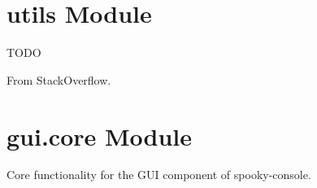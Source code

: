 \documentclass[letterpaper,10pt,english,openany,oneside]{sphinxmanual}
\begin{document}
\section{utils Module}
\label{\detokenize{api:module-spookyconsole.utils}}\label{\detokenize{api:utils-module}}
TODO

\begin{fulllineitems}
\label{\detokenize{api:spookyconsole.utils.find_nth}}
From StackOverflow.

\end{fulllineitems}



\section{gui.core Module}
\label{\detokenize{api:module-spookyconsole.gui.core}}\label{\detokenize{api:gui-core-module}}
Core functionality for the GUI component of spooky-console.
\end{document}
